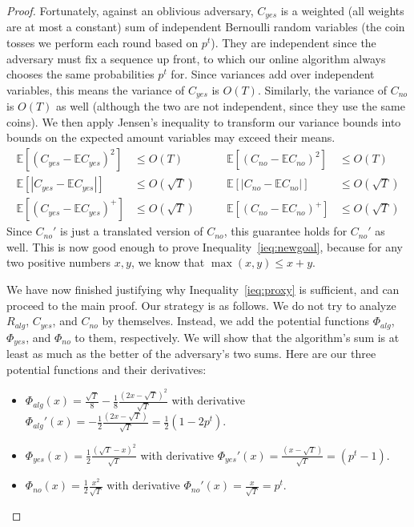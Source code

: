 \documentclass[final,12pt]{colt2018}
\newcommand{\E}{\mathbb{E}}
\newcommand{\RewardAlg}{R_{alg}}
\newcommand{\CostYes}{C_{yes}}
\newcommand{\CostNo}{C_{no}}
\newcommand{\Potential}{\Phi}
\newcommand{\PotentialAlg}{\Potential_{alg}}
\newcommand{\PotentialYes}{\Potential_{yes}}
\newcommand{\PotentialNo}{\Potential_{no}}
\begin{document}
\begin{proof}
  Fortunately, against an oblivious adversary,
  $\CostYes$ is a weighted (all weights are at most a constant) sum of independent
  Bernoulli random variables (the coin tosses we perform each round based on
  $p^t$). They are independent since the adversary must fix a sequence up front,
  to which our online algorithm always chooses the same probabilities $p^t$ for.
  Since variances add over independent variables, this means the variance of
  $\CostYes$ is $O(T)$. Similarly, the variance of $\CostNo$ is $O(T)$ as well
  (although the two are not independent, since they use the same coins). We
  then apply Jensen's inequality to transform our variance bounds into bounds on
  the expected amount variables may exceed their means.
  \begin{align*}
    \E \left[ (\CostYes - \E \CostYes)^2 \right] &\le O(T) &\qquad
    \E \left[ (\CostNo - \E \CostNo)^2 \right] &\le O(T) \\
    \E \left[ \left\lvert \CostYes - \E \CostYes \right\rvert \right] &\le O(\sqrt{T}) &\qquad
    \E \left[ \left\lvert \CostNo - \E \CostNo \right\rvert \right] &\le O(\sqrt{T}) \\
    \E \left[ \left( \CostYes - \E \CostYes \right)^+ \right] &\le O(\sqrt{T}) &\qquad
    \E \left[ \left( \CostNo - \E \CostNo \right)^+ \right] &\le O(\sqrt{T})
  \end{align*}
  Since $\CostNo'$ is just a translated version of $\CostNo$, this guarantee
  holds for $\CostNo'$ as well. This is now good enough to prove
  Inequality~\ref{ieq:newgoal}, because for any two positive numbers
  $x, y$, we know that $\max (x, y) \le x + y$.
  
  We have now finished justifying why Inequality~\ref{ieq:proxy} is sufficient,
  and can proceed to the main proof. Our strategy is as follows. We do not try to
  analyze $\RewardAlg$, $\CostYes$, and $\CostNo$ by themselves. Instead, we
  add the potential functions $\PotentialAlg$, $\PotentialYes$, and
  $\PotentialNo$ to them, respectively. We will show that the algorithm's sum is
  at least as much as the better of the adversary's two sums. Here are our three
  potential functions and their derivatives:
  \begin{itemize}
    \item $\PotentialAlg(x) = \frac{\sqrt{T}}{8} -\frac18 \frac{(2x-\sqrt{T})^2}{\sqrt{T}}$ with derivative $\PotentialAlg'(x) = -\frac12 \frac{(2x - \sqrt{T})}{\sqrt{T}} = \frac12 (1 - 2p^t)$.
    \item $\PotentialYes(x) = \frac12 \frac{(\sqrt{T}-x)^2}{\sqrt{T}}$ with derivative $\PotentialYes'(x) = \frac{(x - \sqrt{T})}{\sqrt{T}} = (p^t-1)$.
    \item $\PotentialNo(x) = \frac12 \frac{x^2}{\sqrt{T}}$ with derivative $\PotentialNo'(x) = \frac{x}{\sqrt{T}} = p^t$.
  \end{itemize}
  

\end{proof}
\end{document}
